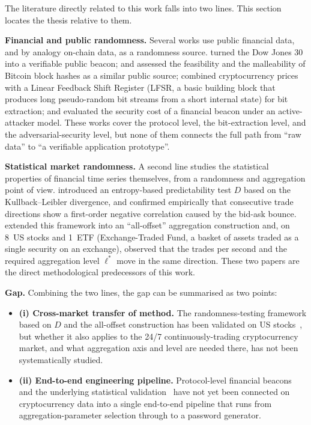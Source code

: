 \documentclass[11pt,titlepage,openany,oneside]{book}  %
\begin{document}
The literature directly related to this work falls into two lines. This section locates the thesis relative to them.

\textbf{Financial and public randomness.} Several works use public financial data, and by analogy on-chain data, as a randomness source. \citet{clark2010beacon} turned the Dow Jones 30 into a verifiable public beacon; \citet{bonneau2015bitcoin} and \citet{pierrot2018malleability} assessed the feasibility and the malleability of Bitcoin block hashes as a similar public source; \citet{chiba2024lfsr} combined cryptocurrency prices with a Linear Feedback Shift Register (LFSR, a basic building block that produces long pseudo-random bit streams from a short internal state) for bit extraction; and \citet{landis2025beacon} evaluated the security cost of a financial beacon under an active-attacker model. These works cover the protocol level, the bit-extraction level, and the adversarial-security level, but none of them connects the full path from ``raw data'' to ``a verifiable application prototype''.

\textbf{Statistical market randomness.} A second line studies the statistical properties of financial time series themselves, from a randomness and aggregation point of view. \citet{shternshis2025predictability} introduced an entropy-based predictability test $D$ based on the Kullback--Leibler divergence, and confirmed empirically that consecutive trade directions show a first-order negative correlation caused by the bid-ask bounce. \citet{onofri2025emergence} extended this framework into an ``all-offset'' aggregation construction and, on 8~US stocks and 1~ETF (Exchange-Traded Fund, a basket of assets traded as a single security on an exchange), observed that the trades per second and the required aggregation level $\ell^*$ move in the same direction. These two papers are the direct methodological predecessors of this work.

\textbf{Gap.} Combining the two lines, the gap can be summarised as two points:
\begin{itemize}
\item \textbf{(i) Cross-market transfer of method.} The randomness-testing framework based on $D$ and the all-offset construction has been validated on US stocks~\citep{shternshis2025predictability,onofri2025emergence}, but whether it also applies to the 24/7 continuously-trading cryptocurrency market, and what aggregation axis and level are needed there, has not been systematically studied.
\item \textbf{(ii) End-to-end engineering pipeline.} Protocol-level financial beacons~\citep{clark2010beacon,chiba2024lfsr,landis2025beacon} and the underlying statistical validation~\citep{shternshis2025predictability,onofri2025emergence} have not yet been connected on cryptocurrency data into a single end-to-end pipeline that runs from aggregation-parameter selection through to a password generator.
\end{itemize}
\end{document}
